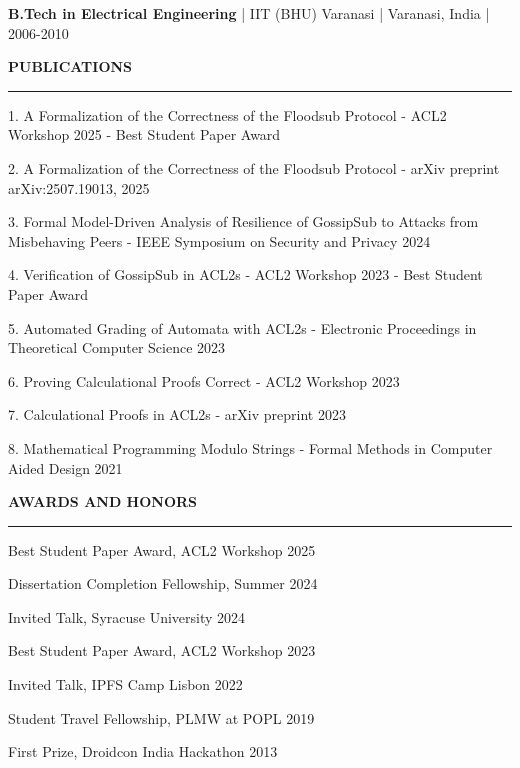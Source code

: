 \documentclass[11pt,letterpaper]{article}
\newcommand{\cvsection}[1]{
    \vspace{0.5em}
    \textbf{\large #1}
    \vspace{0.2em}
    \hrule
    \vspace{0.3em}
}
\begin{document}
\textbf{B.Tech in Electrical Engineering} | IIT (BHU) Varanasi | Varanasi, India | 2006-2010

\cvsection{PUBLICATIONS}

1. A Formalization of the Correctness of the Floodsub Protocol - ACL2 Workshop 2025 - Best Student Paper Award

2. A Formalization of the Correctness of the Floodsub Protocol - arXiv preprint arXiv:2507.19013, 2025

3. Formal Model-Driven Analysis of Resilience of GossipSub to Attacks from Misbehaving Peers - IEEE Symposium on Security and Privacy 2024

4. Verification of GossipSub in ACL2s - ACL2 Workshop 2023 - Best Student Paper Award

5. Automated Grading of Automata with ACL2s - Electronic Proceedings in Theoretical Computer Science 2023

6. Proving Calculational Proofs Correct - ACL2 Workshop 2023

7. Calculational Proofs in ACL2s - arXiv preprint 2023

8. Mathematical Programming Modulo Strings - Formal Methods in Computer Aided Design 2021

\cvsection{AWARDS AND HONORS}

Best Student Paper Award, ACL2 Workshop 2025

Dissertation Completion Fellowship, Summer 2024

Invited Talk, Syracuse University 2024

Best Student Paper Award, ACL2 Workshop 2023

Invited Talk, IPFS Camp Lisbon 2022

Student Travel Fellowship, PLMW at POPL 2019

First Prize, Droidcon India Hackathon 2013
\end{document}
